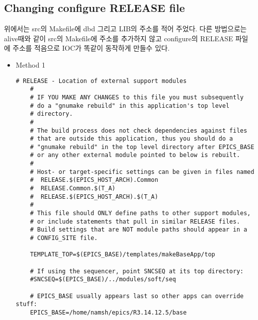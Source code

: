 \documentclass[11pt
  , a4paper
  , article
  , oneside
]{memoir}
\begin{document}
\subsection{Changing configure RELEASE file}
위에서는 src의 Makefile에 dbd 그리고 LIB의 주소를 적어 주었다. 다른 방법으로는 alive때와 같이
src의 Makefile에 주소를 추가하지 않고 configure의 RELEASE 파일에 주소를 적음으로 IOC가 똑같이
동작하게 만들수 있다.
\begin{itemize}
	\item Method 1
	
	\begin{lstlisting}[style=termstyle]
	# RELEASE - Location of external support modules
	#
	# IF YOU MAKE ANY CHANGES to this file you must subsequently
	# do a "gnumake rebuild" in this application's top level
	# directory.
	#
	# The build process does not check dependencies against files
	# that are outside this application, thus you should do a
	# "gnumake rebuild" in the top level directory after EPICS_BASE
	# or any other external module pointed to below is rebuilt.
	#
	# Host- or target-specific settings can be given in files named
	#  RELEASE.$(EPICS_HOST_ARCH).Common
	#  RELEASE.Common.$(T_A)
	#  RELEASE.$(EPICS_HOST_ARCH).$(T_A)
	#
	# This file should ONLY define paths to other support modules,
	# or include statements that pull in similar RELEASE files.
	# Build settings that are NOT module paths should appear in a
	# CONFIG_SITE file.
	
	TEMPLATE_TOP=$(EPICS_BASE)/templates/makeBaseApp/top
	
	# If using the sequencer, point SNCSEQ at its top directory:
	#SNCSEQ=$(EPICS_BASE)/../modules/soft/seq
	
	# EPICS_BASE usually appears last so other apps can override stuff:
	EPICS_BASE=/home/namsh/epics/R3.14.12.5/base
	

\end{lstlisting}
\end{itemize}
\end{document}
